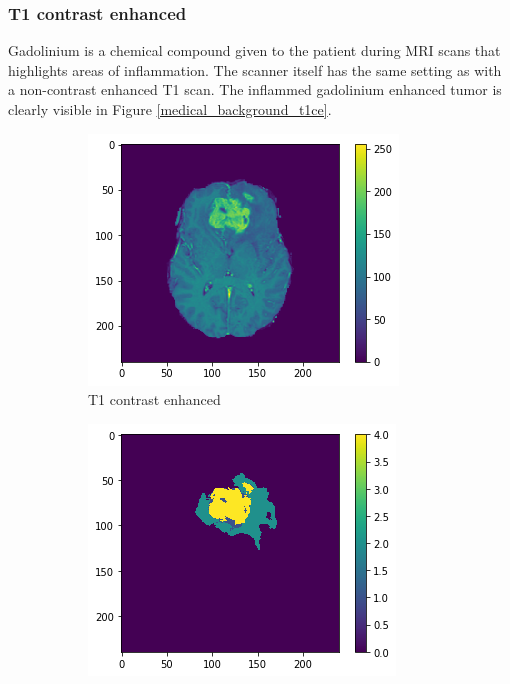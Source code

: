 


\subsubsection{T1 contrast enhanced}
Gadolinium is a chemical compound given to the patient during MRI scans that highlights areas of inflammation.
The scanner itself has the same setting as with a non-contrast enhanced T1 scan. The inflammed gadolinium enhanced tumor is clearly visible in Figure \ref{medical_background_t1ce}.

\begin{figure}[H]
    \centering
    \begin{subfigure}{.5\textwidth}
        \centering
        \includegraphics[width=\linewidth]{chapters/04_segmentation/images/medical_background/t1ce.png}
        \caption{T1 contrast enhanced}
    \end{subfigure}%
    \begin{subfigure}{.5\textwidth}
        \centering
        \includegraphics[width=\linewidth]{chapters/04_segmentation/images/medical_background/tumor.png}

\end{subfigure}
\end{figure}
